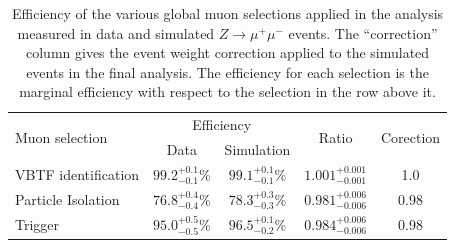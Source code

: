 \begin{table}[t]
\begin{center}
\begin{tabular}{|l|c|c|c|c|}
\hline
\multirow{2}{*}{Muon selection} &  \multicolumn{2}{c|}{Efficiency} & \multirow{2}{*}{Ratio} & \multirow{2}{*}{Corection} \\ 
&  Data  &          Simulation &      &      \\ 
\hline
VBTF identification &   $99.2^{+0.1}_{-0.1}$\%  &  $99.1^{+0.1}_{-0.1}$\% & $1.001^{+0.001}_{-0.001}$ & 1.0\\
Particle Isolation  &  $76.8^{+0.4}_{-0.4}$\% &  $78.3^{+0.3}_{-0.3}$\% & $0.981^{+0.006}_{-0.006}$ & 0.98 \\
Trigger             &   $95.0^{+0.5}_{-0.5}$\% & $96.5^{+0.1}_{-0.2}$\% & $0.984^{+0.006}_{-0.006}$ & 0.98 \\
\hline
\end{tabular}
\end{center}
\begin{center}
\caption[Muon trigger, identification, and isolation correction
factors]{Efficiency of the various global muon selections applied in the
analysis measured in data and simulated $Z\rightarrow\mu^+\mu^-$ events.  The
``correction'' column gives the event weight correction applied to the simulated
events in the final analysis.  The efficiency for each selection is the marginal
efficiency with respect to the selection in the row above it.  }

\label{tab:muonTagAndProbeResults}
\end{center}
\end{table}


